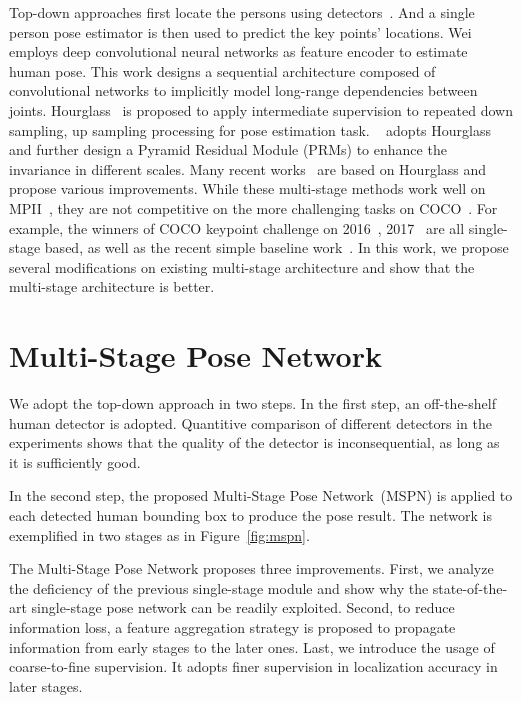 \documentclass[10pt,twocolumn,letterpaper]{article}
\begin{document}
Top-down approaches first locate the persons using detectors~\cite{ren2015faster,lin2017feature,li2018detnet}. And a single person pose estimator is then used to predict the key points' locations. Wei~\etal~\cite{wei2016convolutional} employs deep convolutional neural networks as feature encoder to estimate human pose. This work designs a sequential architecture composed of convolutional networks to implicitly model long-range dependencies between joints. Hourglass~\cite{newell2016stacked} is proposed to apply intermediate supervision to repeated down sampling, up sampling processing for pose estimation task. ~\cite{yang2017learning} adopts Hourglass and further design a Pyramid Residual Module (PRMs) to enhance the invariance in different scales. Many recent works~\cite{ke2018multi, Chen_2017_ICCV, Xiao-Multi, Tang_2018_ECCV, zhang2019human} are based on Hourglass and propose various improvements. While these multi-stage methods work well on MPII~\cite{andriluka20142d}, they are not competitive on the more challenging tasks on COCO~\cite{lin2014microsoft}. For example, the winners of COCO keypoint challenge on 2016~\cite{papandreou2017towards}, 2017~\cite{chen2018cascaded} are all single-stage based, as well as the recent simple baseline work~\cite{xiao2018simple}. In this work, we propose several modifications on existing multi-stage architecture and show that the multi-stage architecture is better.


\section{Multi-Stage Pose Network}
We adopt the top-down approach in two steps. In the first step, an off-the-shelf human detector is adopted. Quantitive comparison of different detectors in the experiments shows that the quality of the detector is inconsequential, as long as it is sufficiently good.

In the second step, the proposed Multi-Stage Pose Network~(MSPN) is applied to each detected human bounding box to produce the pose result. The network is exemplified in two stages as in Figure~\ref{fig:mspn}.

The Multi-Stage Pose Network proposes three improvements. First, we analyze the deficiency of the previous single-stage module and show why the state-of-the-art single-stage pose network can be readily exploited. Second, to reduce information loss, a feature aggregation strategy is proposed to propagate information from early stages to the later ones. Last, we introduce the usage of coarse-to-fine supervision. It adopts finer supervision in localization accuracy in later stages. 
\end{document}
